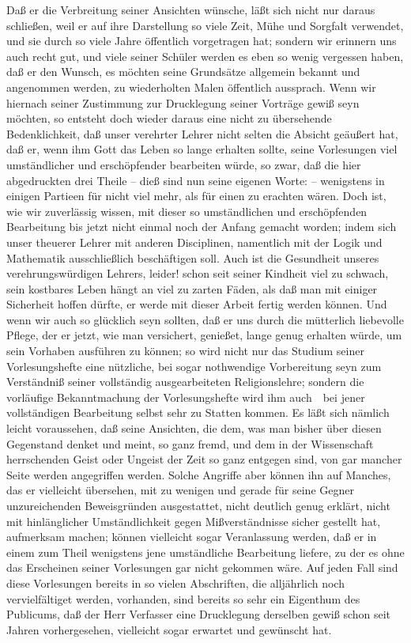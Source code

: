 Daß er die Verbreitung seiner Ansichten wünsche, läßt sich nicht nur daraus schließen, weil er auf ihre Darstellung so viele Zeit, Mühe und Sorgfalt verwendet, und sie durch so viele Jahre öffentlich vorgetragen hat; sondern wir erinnern uns auch recht gut, und viele seiner Schüler werden es eben so wenig vergessen haben, daß er den Wunsch, es möchten seine Grundsätze allgemein bekannt und angenommen werden, zu wiederholten Malen öffentlich aussprach. Wenn wir hiernach seiner Zustimmung zur Drucklegung seiner Vorträge gewiß seyn möchten, so entsteht doch wieder daraus eine nicht zu übersehende Bedenklichkeit, daß unser verehrter Lehrer nicht selten die Absicht geäußert hat, daß er, wenn ihm Gott das Leben so lange erhalten sollte, seine Vorlesungen viel umständlicher und erschöpfender bearbeiten würde, so zwar, daß die hier abgedruckten drei Theile -- dieß sind nun seine eigenen Worte: -- wenigstens in einigen Partieen für nicht viel mehr, als für einen  zu erachten wären. Doch ist, wie wir zuverlässig wissen, mit dieser so umständlichen und erschöpfenden Bearbeitung bis jetzt nicht einmal noch der Anfang gemacht worden; indem sich unser theuerer Lehrer mit anderen Disciplinen, namentlich mit der Logik und Mathematik ausschließlich beschäftigen soll. Auch ist die Gesundheit unseres verehrungswürdigen Lehrers, leider! schon seit seiner Kindheit viel zu schwach, sein kostbares Leben hängt an viel zu zarten Fäden, als daß man mit einiger Sicherheit hoffen dürfte, er werde mit dieser Arbeit fertig werden können. Und wenn wir auch so glücklich seyn sollten, daß er uns durch die mütterlich liebevolle Pflege, der er jetzt, wie man versichert, genießet, lange genug erhalten würde, um sein Vorhaben ausführen zu können; so wird nicht nur das Studium seiner Vorlesungshefte eine nützliche, bei  sogar nothwendige Vorbereitung seyn zum Verständniß seiner vollständig ausgearbeiteten Religionslehre; sondern die vorläufige Bekanntmachung der Vorlesungshefte wird ihm auch~\ bei jener vollständigen Bearbeitung selbst sehr zu Statten kommen. Es läßt sich nämlich leicht voraussehen, daß seine Ansichten, die dem, was man bisher über diesen Gegenstand denket und meint, so ganz fremd, und dem in der Wissenschaft herrschenden Geist oder Ungeist der Zeit so ganz entgegen sind, von gar mancher Seite werden angegriffen werden. Solche Angriffe aber können ihn auf Manches, das er vielleicht übersehen, mit zu wenigen und gerade für seine Gegner unzureichenden Beweisgründen ausgestattet, nicht deutlich genug erklärt, nicht mit hinlänglicher Umständlichkeit gegen Mißverständnisse sicher gestellt hat, aufmerksam machen; können vielleicht sogar Veranlassung werden, daß er in einem  zum Theil wenigstens jene umständliche Bearbeitung liefere, zu der es ohne das Erscheinen seiner Vorlesungen gar nicht gekommen wäre. Auf jeden Fall sind diese Vorlesungen bereits in so vielen Abschriften, die alljährlich noch vervielfältiget werden, vorhanden, sind bereits so sehr ein Eigenthum des Publicums, daß der Herr Verfasser eine Drucklegung derselben gewiß schon seit Jahren vorhergesehen, vielleicht sogar erwartet und gewünscht hat.\par
